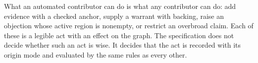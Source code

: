What an automated contributor can do is what any contributor can do: add evidence with a checked anchor, supply a warrant with backing, raise an objection whose active region is nonempty, or restrict an overbroad claim. Each of these is a legible act with an effect on the graph. The specification does not decide whether such an act is wise. It decides that the act is recorded with its origin mode and evaluated by the same rules as every other.
